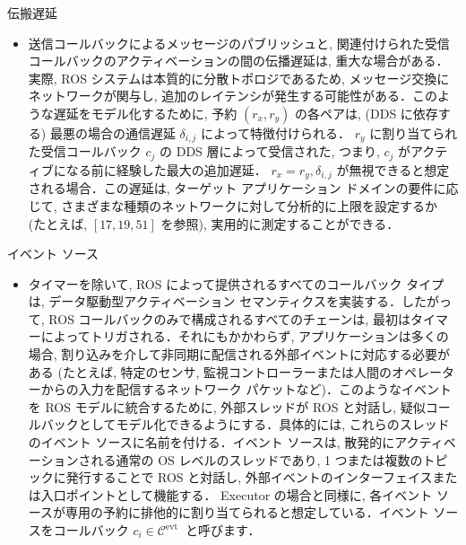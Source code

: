 \begin{frame}{伝搬遅延}
    \begin{itemize}
        \item 送信コールバックによるメッセージのパブリッシュと, 関連付けられた受信コールバックのアクティベーションの間の伝播遅延は, 重大な場合がある．実際, ROS システムは本質的に分散トポロジであるため, メッセージ交換にネットワークが関与し, 追加のレイテンシが発生する可能性がある．このような遅延をモデル化するために, 予約 $\left(r_{x}, r_{y}\right)$ の各ペアは, (DDS に依存する) 最悪の場合の通信遅延 $\delta_{i, j}$ によって特徴付けられる． $r_{y}$ に割り当てられた受信コールバック $c_{j}$ の DDS 層によって受信された, つまり, $c_{j}$ がアクティブになる前に経験した最大の追加遅延． $r_{x}=r_{y}, \delta_{i, j}$ が無視できると想定される場合．この遅延は, ターゲット アプリケーション ドメインの要件に応じて, さまざまな種類のネットワークに対して分析的に上限を設定するか (たとえば,  $[17,19,51]$ を参照), 実用的に測定することができる．
    \end{itemize}
\end{frame}

\begin{frame}{イベント ソース}
    \begin{itemize}
        \item タイマーを除いて, ROS によって提供されるすべてのコールバック タイプは, データ駆動型アクティベーション セマンティクスを実装する．したがって, ROS コールバックのみで構成されるすべてのチェーンは, 最初はタイマーによってトリガされる．それにもかかわらず, アプリケーションは多くの場合, 割り込みを介して非同期に配信される外部イベントに対応する必要がある (たとえば, 特定のセンサ, 監視コントローラーまたは人間のオペレーターからの入力を配信するネットワーク パケットなど)．このようなイベントを ROS モデルに統合するために, 外部スレッドが ROS と対話し, 疑似コールバックとしてモデル化できるようにする．具体的には, これらのスレッドのイベント ソースに名前を付ける．イベント ソースは, 散発的にアクティベーションされる通常の OS レベルのスレッドであり, 1 つまたは複数のトピックに発行することで ROS と対話し, 外部イベントのインターフェイスまたは入口ポイントとして機能する． Executor の場合と同様に, 各イベント ソースが専用の予約に排他的に割り当てられると想定している．イベント ソースをコールバック $c_{i} \in \mathcal{C}^{\text {evt }}$ と呼びます．
    \end{itemize}
\end{frame}
